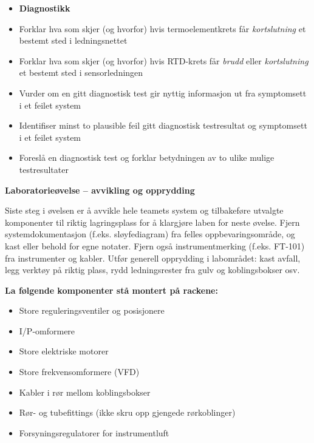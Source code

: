 \filbreak

\begin{itemize}
\item{} {\bf Diagnostikk}
\item{} Forklar hva som skjer (og hvorfor) hvis termoelementkrets får {\it kortslutning} et bestemt sted i ledningsnettet
\item{} Forklar hva som skjer (og hvorfor) hvis RTD-krets får {\it brudd} eller {\it kortslutning} et bestemt sted i sensorledningen
\item{} Vurder om en gitt diagnostisk test gir nyttig informasjon ut fra symptomsett i et feilet system
\item{} Identifiser minst to plausible feil gitt diagnostisk testresultat og symptomsett i et feilet system
\item{} Foreslå en diagnostisk test og forklar betydningen av to ulike mulige testresultater
\end{itemize}


\vfil \eject

\noindent
{\bf Laboratorieøvelse -- avvikling og opprydding}

\vskip 5pt

Siste steg i øvelsen er å avvikle hele teamets system og tilbakeføre utvalgte komponenter til riktig lagringsplass for å klargjøre laben for neste øvelse. Fjern systemdokumentasjon (f.eks. sløyfediagram) fra felles oppbevaringsområde, og kast eller behold for egne notater. Fjern også instrumentmerking (f.eks. FT-101) fra instrumenter og kabler. Utfør generell opprydding i labområdet: kast avfall, legg verktøy på riktig plass, rydd ledningsrester fra gulv og koblingsbokser osv.

\vskip 10pt

\indent
{\bf La følgende komponenter stå montert på rackene:}

\begin{itemize}
\item{} Store reguleringsventiler og posisjonere
\item{} I/P-omformere
\item{} Store elektriske motorer
\item{} Store frekvensomformere (VFD)
\item{} Kabler i rør mellom koblingsbokser
\item{} Rør- og tubefittings (ikke skru opp gjengede rørkoblinger)
\item{} Forsyningsregulatorer for instrumentluft
\end{itemize}

